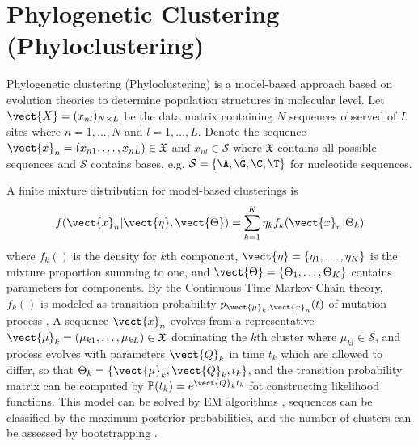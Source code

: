 \section[Phylogenetic Clustering (Phyloclustering)]{Phylogenetic Clustering (Phyloclustering)}
\label{sec:phyloclustering}


Phylogenetic clustering (Phyloclustering) is a model-based
approach based on evolution theories to determine population
structures in molecular level.
Let $\vect{X} = (x_{nl})_{N\times L}$ be the data matrix containing
$N$ sequences observed of $L$ sites where $n = 1, \ldots, N$ and
$l = 1, \ldots, L$. Denote the sequence
$\vect{x}_n = (x_{n1}, \ldots, x_{nL}) \in \mathfrak{X}$ and
$x_{nl} \in \mathcal{S}$ where
$\mathfrak{X}$ contains all possible sequences and
$\mathcal{S}$ contains bases, e.g. $\mathcal{S} = \{\A, \G, \C, \T\}$
for nucleotide sequences.

A finite mixture distribution for model-based clusterings is
\begin{equation*}
f(\vect{x}_n | \vect{\eta}, \vect{\Theta}) =
\sum_{k = 1}^K \eta_k f_k(\vect{x}_n | \Theta_k)
\end{equation*}
where $f_k()$ is the density for $k$th component,
$\vect{\eta} = \{\eta_1, \ldots, \eta_K\}$ is the mixture proportion
summing to one, and
$\vect{\Theta} = \{\Theta_1,\ldots,\Theta_K\}$ contains parameters for
components.  By the Continuous Time Markov Chain theory,
$f_k()$ is modeled as transition probability
$p_{\vect{\mu}_k,\vect{x}_n}(t)$ of mutation process \citep{Felsenstein2004}.
A sequence $\vect{x}_n$ evolves from
a representative
$\vect{\mu}_k = (\mu_{k1}, \ldots, \mu_{kL}) \in \mathfrak{X}$
dominating the $k$th cluster where $\mu_{kl} \in \mathcal{S}$,
and process evolves with parameters $\vect{Q}_k$ in time $t_k$
which are allowed to differ, so that
$\Theta_k = \{\vect{\mu}_k, \vect{Q}_k, t_k\}$,
and the transition probability matrix can be computed by
$\mathbb{P}(t_k) = e^{\vect{Q}_k t_k}$ fot constructing likelihood functions.
This model can be solved by EM algorithms \citep{Dempster1977}, sequences can
be classified by the maximum posterior probabilities, and the number of
clusters can be assessed by bootstrapping \citep{Maitra2010}.

